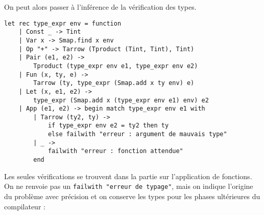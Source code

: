 \documentclass{cours}
\begin{document}
On peut alors passer à l'inférence de la vérification des types.
\begin{verbatim}
let rec type_expr env = function
    | Const _ -> Tint
    | Var x -> Smap.find x env
    | Op "+" -> Tarrow (Tproduct (Tint, Tint), Tint)
    | Pair (e1, e2) ->
        Tproduct (type_expr env e1, type_expr env e2)
    | Fun (x, ty, e) ->
        Tarrow (ty, type_expr (Smap.add x ty env) e)
    | Let (x, e1, e2) ->
        type_expr (Smap.add x (type_expr env e1) env) e2
    | App (e1, e2) -> begin match type_expr env e1 with
        | Tarrow (ty2, ty) ->
            if type_expr env e2 = ty2 then ty
            else failwith "erreur : argument de mauvais type"
        | _ ->
            failwith "erreur : fonction attendue"
        end
\end{verbatim}

Les seules vérifications se trouvent dans la partie sur l'application de fonctions.\\
On ne renvoie pas un \texttt{failwith "erreur de typage"}, mais on indique l'origine du problème avec précision et on conserve les types pour les phases ultérieures du compilateur :
\end{document}
